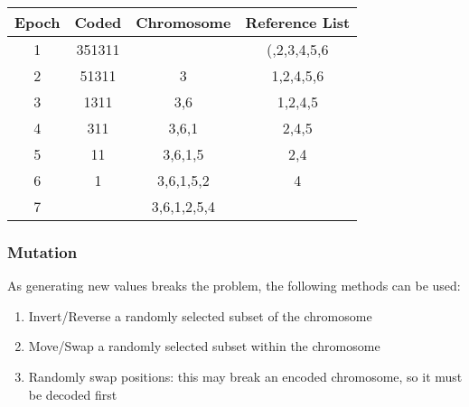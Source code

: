 \begin{table}[H]
\centering
\begin{tabular}{|c|c|c|c|}
\hline
Epoch & Coded & Chromosome & Reference List \\ \hline
1 &  351311 & & (,2,3,4,5,6 \\ \hline
2 &  51311 & 3 & 1,2,4,5,6\\ \hline
3 &  1311 & 3,6 & 1,2,4,5\\ \hline
4 &  311 & 3,6,1 & 2,4,5\\ \hline
5 &  11 & 3,6,1,5 & 2,4\\ \hline
6 &  1 & 3,6,1,5,2 & 4\\ \hline
7 &  &  3,6,1,2,5,4 & \\ \hline
\end{tabular}
\end{table}

\subsubsection{Mutation}
As generating new values breaks the problem, the following methods can be used:

\begin{enumerate}
    \item Invert/Reverse a randomly selected subset of the chromosome
    \item Move/Swap a randomly selected subset within the chromosome
    \item Randomly swap positions: this may break an encoded chromosome, so it must be decoded first
\end{enumerate}

